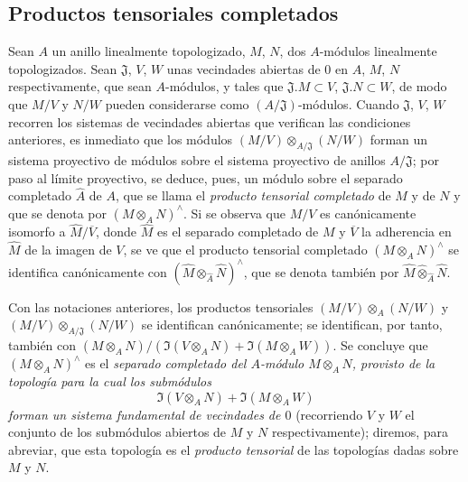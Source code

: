 \subsection{Productos tensoriales completados}
\label{subsection:0.7.7-fr}

\begin{env}[7.7.1]
\label{0.7.7.1-fr}
Sean $A$ un anillo linealmente topologizado, $M$, $N$, dos $A$-módulos
linealmente topologizados. Sean $\mathfrak J$, $V$, $W$ unas vecindades
abiertas de $0$ en $A$, $M$, $N$ respectivamente, que sean
$A$-módulos, y tales que $\mathfrak J.M\subset V$, $\mathfrak J.N\subset W$,
de modo que $M/V$ y $N/W$ pueden considerarse como
$(A/\mathfrak J)$-módulos. Cuando $\mathfrak J$, $V$, $W$ recorren los
sistemas de vecindades abiertas que verifican las condiciones anteriores, es
inmediato que los módulos
$(M/V)\otimes_{A/\mathfrak J}(N/W)$ forman un sistema proyectivo de módulos
sobre el sistema proyectivo de anillos $A/\mathfrak J$; por paso al límite
proyectivo, se deduce, pues, un módulo sobre el separado completado $\widehat A$
de $A$, que se llama el \emph{producto tensorial completado} de $M$ y de
$N$ y que se denota por $(M\otimes_A N)^\wedge$. Si se observa que $M/V$
es canónicamente isomorfo a $\widehat M/\overline V$, donde $\widehat M$ es
el separado completado de $M$ y $\overline V$ la adherencia en $\widehat M$ de
la imagen de $V$, se ve que el producto tensorial completado
$(M\otimes_A N)^\wedge$ se identifica canónicamente con
$(\widehat M\otimes_{\widehat A}\widehat N)^\wedge$, que se denota también por
$\widehat M\widehat\otimes_{\widehat A}\widehat N$.
\end{env}

\begin{env}[7.7.2]
\label{0.7.7.2-fr}
\begin{sloppypar}
Con las notaciones anteriores, los productos tensoriales
$(M/V)\otimes_A(N/W)$ y
$(M/V)\otimes_{A/\mathfrak J}(N/W)$ se identifican canónicamente;
se identifican, por tanto, también con
$(M\otimes_A N)/(\Im(V\otimes_A N)+\Im(M\otimes_A W))$.
Se concluye que $(M\otimes_A N)^\wedge$ es el \emph{separado completado del
$A$-módulo $M\otimes_A N$, provisto de la topología para la cual los
submódulos}
\[
  \Im(V\otimes_A N)+\Im(M\otimes_A W)
\]
\emph{forman un sistema fundamental de vecindades de $0$} (recorriendo $V$ y $W$
el conjunto de los submódulos abiertos de $M$ y $N$
respectivamente); diremos, para abreviar, que esta topología es el
\emph{producto tensorial} de las topologías dadas sobre $M$ y $N$.
\end{sloppypar}
\end{env}


